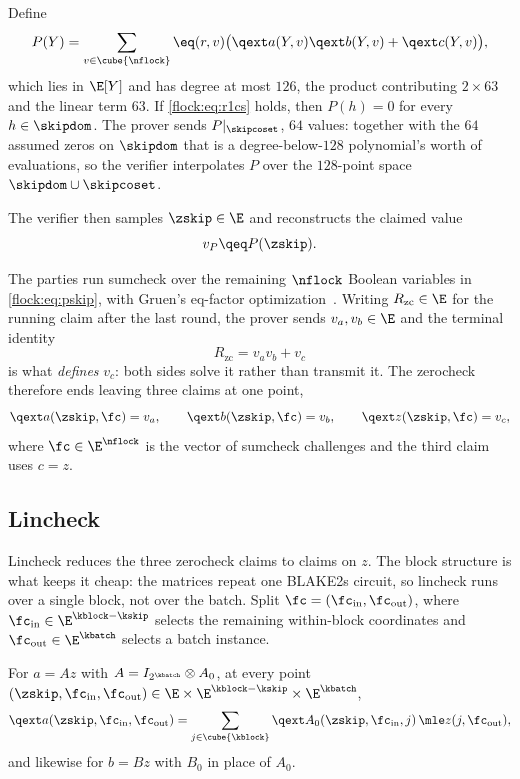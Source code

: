 Define
\begin{equation}\label{flock:eq:pskip}
P(Y)=\sum_{v\in\cube{\nflock}}\eq(r,v)\bigl(\qext a(Y,v)\qext b(Y,v)+\qext c(Y,v)\bigr),
\end{equation}
which lies in $\E[Y]$ and has degree at most $126$, the product contributing $2\times 63$ and the linear term $63$. If \eqref{flock:eq:r1cs} holds, then $P(h)=0$ for every $h\in\skipdom$. The prover sends $P|_{\skipcoset}$, $64$ values: together with the $64$ assumed zeros on $\skipdom$ that is a degree-below-$128$ polynomial's worth of evaluations, so the verifier interpolates $P$ over the $128$-point space $\skipdom\cup\skipcoset$.

The verifier then samples $\zskip\in\E$ and reconstructs the claimed value
\[
v_P \qeq P(\zskip).
\]

The parties run sumcheck over the remaining $\nflock$ Boolean variables in \eqref{flock:eq:pskip}, with Gruen's eq-factor optimization~\cite{Gru24}. Writing $R_{\mathrm{zc}}\in\E$ for the running claim after the last round, the prover sends $v_a,v_b\in\E$ and the terminal identity
\begin{equation}\label{flock:eq:zc-terminal}
R_{\mathrm{zc}}=v_av_b+v_c
\end{equation}
is what \emph{defines} $v_c$: both sides solve it rather than transmit it. The zerocheck therefore ends leaving three claims at one point,
\begin{equation}\label{flock:eq:zc-claims}
\qext a(\zskip,\fc)=v_a,\qquad \qext b(\zskip,\fc)=v_b,\qquad \qext z(\zskip,\fc)=v_c,
\end{equation}
where $\fc\in\E^{\nflock}$ is the vector of sumcheck challenges and the third claim uses $c=z$.

\subsection{Lincheck}\label{flock:lincheck}

Lincheck reduces the three zerocheck claims to claims on $z$. The block structure is what keeps it cheap: the matrices repeat one BLAKE2s circuit, so lincheck runs over a single block, not over the batch. Split $\fc=(\fc_{\mathrm{in}},\fc_{\mathrm{out}})$, where $\fc_{\mathrm{in}}\in\E^{\kblock-\kskip}$ selects the remaining within-block coordinates and $\fc_{\mathrm{out}}\in\E^{\kbatch}$ selects a batch instance.

\begin{lemma}\label{lem:flock-block-diagonal}
For $a=Az$ with $A=I_{2^{\kbatch}}\otimes A_0$, at every point $(\zskip,\fc_{\mathrm{in}},\fc_{\mathrm{out}})\in\E\times\E^{\kblock-\kskip}\times\E^{\kbatch}$,
\[
\qext a(\zskip,\fc_{\mathrm{in}},\fc_{\mathrm{out}})=\sum_{j\in\cube{\kblock}}\qext A_0(\zskip,\fc_{\mathrm{in}},j)\,\mle z(j,\fc_{\mathrm{out}}),
\]
and likewise for $b=Bz$ with $B_0$ in place of $A_0$.
\end{lemma}

